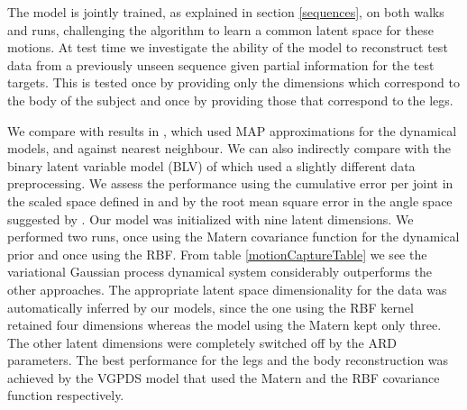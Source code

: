 \documentclass{article} %
\begin{document}
The model is jointly trained, as explained in section \ref{sequences},
on both walks and runs, challenging the algorithm to learn a common latent
space for these motions. At test time we investigate the ability of
the model to reconstruct test data from a previously unseen sequence
given partial information for the test targets. This is tested once by
providing only the dimensions which correspond to the body of the
subject and once by providing those that correspond to the legs.
%
%

We compare with results in \cite{gplvmLarger}, which used MAP
approximations for the dynamical models, and against nearest
neighbour. We can also indirectly compare with the binary latent
variable model (BLV) of \cite{Taylor} which used a slightly different
data preprocessing. We assess the performance using the cumulative
error per joint in the scaled space defined in \cite{Taylor} and by
the root mean square error in the angle space suggested by
\cite{gplvmLarger}. Our model was initialized with nine latent
dimensions. We performed two runs, once using the Matern covariance function for the dynamical prior
and once using the RBF. From table
\ref{motionCaptureTable} we see the variational Gaussian process
dynamical system considerably outperforms the other approaches. 
%
The appropriate latent space dimensionality for the data was automatically
inferred by our models, since the one using the RBF kernel retained four dimensions 
whereas the model using the Matern kept only three.
%
%
The
other latent dimensions were completely switched off by the ARD
parameters. 
The best performance for the legs and the body reconstruction was achieved by the VGPDS model that used the Matern and the RBF covariance function respectively.


\end{document}
